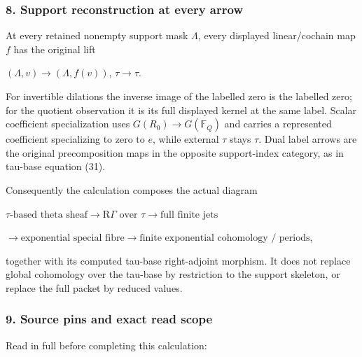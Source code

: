 \subsubsection{8. Support reconstruction at every arrow}\label{endpoint-f1_scaling--support-reconstruction-at-every-arrow}

At every retained nonempty support mask \(\Lambda\), every displayed linear/cochain map \(f\) has the original lift

\((\Lambda,v)\to (\Lambda,f(v))\), \(\tau\to \tau\).

For invertible dilations the inverse image of the labelled zero is the labelled zero; for the quotient observation it is its full displayed kernel at the same label. Scalar coefficient specialization uses \(G(R_0)\to G(\mathbb F_Q)\) and carries a represented coefficient specializing to zero to \(e\), while external \(\tau\) stays \(\tau\). Dual label arrows are the original precomposition maps in the opposite support-index category, as in tau-base equation (31).

Consequently the calculation composes the actual diagram

\(\tau\text{-based theta sheaf}\to\mathrm R\Gamma\text{ over }\tau\to\text{full finite jets}\)

\(\to\text{exponential special fibre}\to\text{finite exponential cohomology / periods}\),

together with its computed tau-base right-adjoint morphism. It does not replace global cohomology over the tau-base by restriction to the support skeleton, or replace the full packet by reduced values.

\subsubsection{9. Source pins and exact read scope}\label{endpoint-f1_scaling--source-pins-and-exact-read-scope}

Read in full before completing this calculation:

